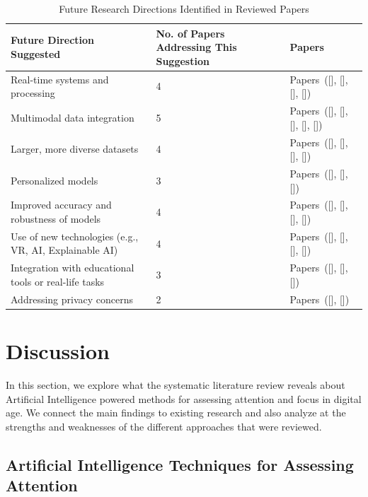 \documentclass[12pt]{article}
\begin{document}
\begin{table}[H]
\centering
\caption{Future Research Directions Identified in Reviewed Papers}
\begin{tabular}{|p{}|p{}|p{}|}
\hline
\textbf{Future Direction Suggested} & \textbf{No. of Papers Addressing This Suggestion} & \textbf{Papers} \\
\hline
Real-time systems and processing & 4 & Papers~([\citealp{ref1}], [\citealp{ref3}], [\citealp{ref4}], [\citealp{ref18}]) \\
\hline
Multimodal data integration & 5 & Papers~([\citealp{ref2}], [\citealp{ref5}], [\citealp{ref8}], [\citealp{ref11}], [\citealp{ref15}]) \\
\hline
Larger, more diverse datasets & 4 & Papers~([\citealp{ref2}], [\citealp{ref3}], [\citealp{ref5}], [\citealp{ref11}]) \\
\hline
Personalized models & 3 & Papers~([\citealp{ref2}], [\citealp{ref5}], [\citealp{ref3}]) \\
\hline
Improved accuracy and robustness of models & 4 & Papers~([\citealp{ref5}], [\citealp{ref6}], [\citealp{ref9}], [\citealp{ref17}]) \\
\hline
Use of new technologies (e.g., VR, AI, Explainable AI) & 4 & Papers~([\citealp{ref1}], [\citealp{ref6}], [\citealp{ref16}], [\citealp{ref5}]) \\
\hline
Integration with educational tools or real-life tasks & 3 & Papers~([\citealp{ref1}], [\citealp{ref7}], [\citealp{ref6}]) \\
\hline
Addressing privacy concerns & 2 & Papers~([\citealp{ref6}], [\citealp{ref8}]) \\
\hline
\end{tabular}
\end{table}

\section{Discussion}
In this section, we explore what the systematic literature review reveals about Artificial Intelligence powered methods for assessing attention and focus in digital age. We connect the main findings to existing research and also analyze at the strengths and weaknesses of the different approaches that were reviewed.

\subsection{ Artificial Intelligence Techniques for Assessing Attention} \\
\end{document}
